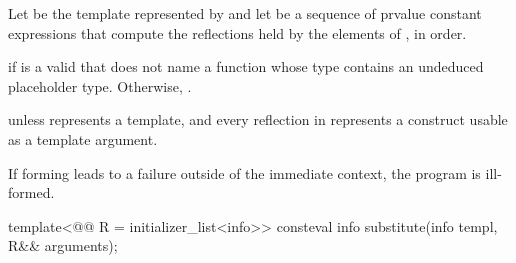 \begin{itemdescr}
\pnum
Let  be the template represented by 
and let  be a sequence of prvalue constant expressions
that compute the reflections held by the elements of ,
in order.

\pnum
\returns
{} if  is a valid 
that does not name a function
whose type contains an undeduced placeholder type.
Otherwise, .

\pnum
\throws
{} unless
 represents a template,
and every reflection in  represents a construct
usable as a template argument.

\pnum
\begin{note}
If forming  leads to a failure
outside of the immediate context,
the program is ill-formed.
\end{note}
\end{itemdescr}

%
\begin{itemdecl}
template<@@ R = initializer_list<info>>
  consteval info substitute(info templ, R&& arguments);
\end{itemdecl}

